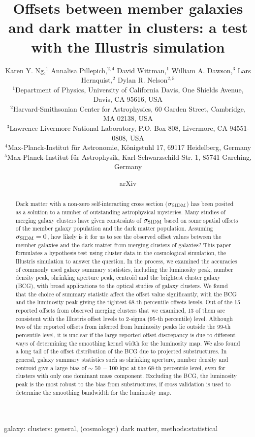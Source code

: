 \documentclass[usenatbib]{mn2e}
\title[Offsets between member galaxies and dark matter in clusters: a
test with the Illustris simulation]{
Offsets between member galaxies and dark matter in clusters: a
	test with the Illustris simulation}
\author[Karen Y. Ng et al.]{Karen Y. Ng,$^1$
	Annalisa Pillepich,$^{2, 4}$ 
	David Wittman,$^1$
	William A. Dawson,$^3$ 
	\newauthor Lars Hernquist,$^{2}$
	Dylan R. Nelson$^{2, 5}$ \\ 
$^{1}$Department of Physics, University of California Davis, One Shields
Avenue, Davis, CA 95616, USA\\ 
$^{2}$Harvard-Smithsonian Center for Astrophysics, 60 Garden Street, Cambridge,
MA 02138, USA\\
$^{3}$Lawrence Livermore National Laboratory, P.O. Box 808, Livermore, CA 94551-0808, USA \\
$^{4}$Max-Planck-Institut f{\"u}r Astronomie, K{\"o}nigstuhl 17, 69117 Heidelberg, Germany\\
$^{5}$Max-Planck-Institut f{\"u}r Astrophysik, Karl-Schwarzschild-Str. 1, 85741 Garching, Germany\\}
\begin{document}
\date{arXiv} \pagerange{\pageref{firstpage}--\pageref{lastpage}}
 \maketitle\label{firstpage}
\begin{abstract} 
	Dark matter with a non-zero self-interacting cross section ($\sigma_{\rm
	SIDM}$) has been posited
	as a solution to a number of outstanding astrophysical mysteries.
	Many studies of merging galaxy clusters have given constraints of
	$\sigma_{\rm SIDM}$ based on some spatial offsets of the member galaxy
	population and the dark matter population.      
	Assuming $\sigma_{\rm SIDM} = 0$, how likely is
	it for us to see the observed offset values between the member galaxies and
	the dark matter from merging clusters of galaxies? 
	This paper formulates a hypothesis test using cluster data in the cosmological 
	simulation, the Illustris simulation to answer the question. 
	In the process,
	we examined the accuracies of commonly used galaxy summary 
	statistics, including the
	luminosity peak, number density peak, shrinking aperture peak, centroid and
	the brightest cluster galaxy (BCG), with broad applications to the optical studies of
	galaxy clusters. 	
	We found that the choice of summary statistic affect the offset
	value significantly, with the BCG and the luminosity peak giving the tightest
	68-th percentile offsets levels.  
	Out of the 15 reported offsets from observed merging clusters
	that we examined, 13 of
	them are consistent with the Illustris offset levels to 2-sigma 
	(95-th percentile) level. Although two of the reported offsets from inferred
	from luminosity peaks lie outside the 99-th percentile level, it is unclear
	if the large reported offset discrepancy is due to different ways of
	determining the smoothing kernel width for the luminosity map. 
	We also found a long
	tail of the offset distribution of the BCG due to projected 
	substructures. In general, galaxy summary statistics such as
	shrinking aperture, number density and centroid give a large bias of $\sim$ 50
	$-$ 100 kpc at
	the 68-th percentile level, even for clusters with only one dominant 
	mass component. Excluding the BCG, 
	the luminosity peak is the most 
	robust to the bias from substructures, 
	if cross validation is used to determine
	the smoothing bandwidth for the luminosity map.
\end{abstract}

\begin{keywords}
	galaxy: clusters: general, (cosmology:) dark matter, methods:statistical 
\end{keywords}





\appendix


\clearpage\bsp\label{lastpage} 
\end{document}
